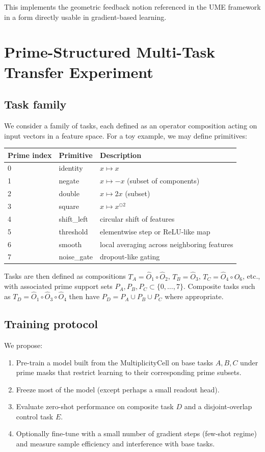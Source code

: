 \documentclass[11pt]{article}
\begin{document}
This implements the geometric feedback notion referenced in the UME framework in a form directly usable in gradient-based learning.

\section{Prime-Structured Multi-Task Transfer Experiment}

\subsection{Task family}

We consider a family of tasks, each defined as an operator composition acting on input vectors in a feature space. For a toy example, we may define primitives:

\begin{center}
\begin{tabular}{lll}
\toprule
Prime index & Primitive & Description \\
\midrule
0 & identity      & $x \mapsto x$ \\
1 & negate        & $x \mapsto -x$ (subset of components) \\
2 & double        & $x \mapsto 2x$ (subset) \\
3 & square        & $x \mapsto x^{\odot 2}$ \\
4 & shift\_left   & circular shift of features \\
5 & threshold     & elementwise step or ReLU-like map \\
6 & smooth        & local averaging across neighboring features \\
7 & noise\_gate   & dropout-like gating \\
\bottomrule
\end{tabular}
\end{center}

Tasks are then defined as compositions $T_A = \hat{O}_1\circ\hat{O}_2$, $T_B = \hat{O}_3$, $T_C = \hat{O}_4\circ\hat{O}_6$, etc., with associated prime support sets $P_A, P_B, P_C\subset\{0,\dots,7\}$. Composite tasks such as $T_D = \hat{O}_1\circ\hat{O}_3\circ\hat{O}_4$ then have $P_D = P_A\cup P_B\cup P_C$ where appropriate.

\subsection{Training protocol}

We propose:
\begin{enumerate}[nosep]
\item Pre-train a model built from the MultiplicityCell on base tasks $A,B,C$ under prime masks that restrict learning to their corresponding prime subsets.
\item Freeze most of the model (except perhaps a small readout head).
\item Evaluate zero-shot performance on composite task $D$ and a disjoint-overlap control task $E$.
\item Optionally fine-tune with a small number of gradient steps (few-shot regime) and measure sample efficiency and interference with base tasks.
\end{enumerate}
\end{document}
